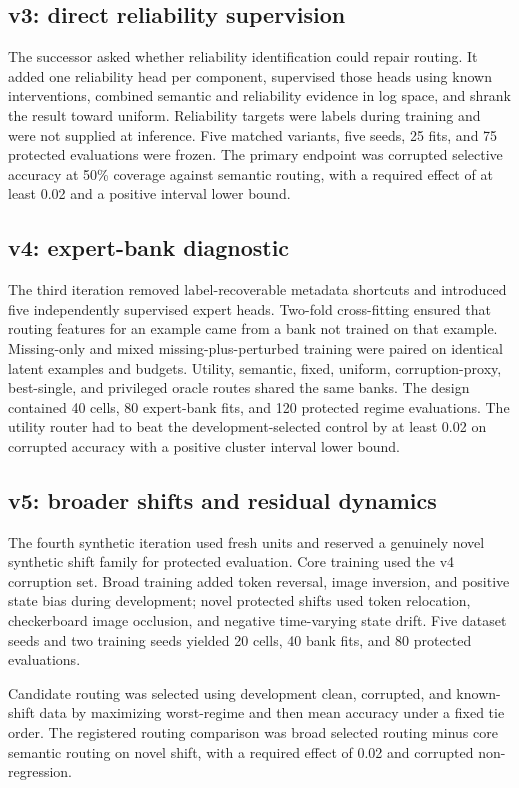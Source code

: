 \documentclass[10pt]{article}
\begin{document}
\subsection{v3: direct reliability supervision}
The successor asked whether reliability identification could repair routing. It added one
reliability head per component, supervised those heads using known interventions, combined
semantic and reliability evidence in log space, and shrank the result toward uniform.
Reliability targets were labels during training and were not supplied at inference. Five
matched variants, five seeds, 25 fits, and 75 protected evaluations were frozen. The
primary endpoint was corrupted selective accuracy at 50\% coverage against semantic
routing, with a required effect of at least 0.02 and a positive interval lower bound.

\subsection{v4: expert-bank diagnostic}
The third iteration removed label-recoverable metadata shortcuts and introduced five
independently supervised expert heads. Two-fold cross-fitting ensured that routing features
for an example came from a bank not trained on that example. Missing-only and mixed
missing-plus-perturbed training were paired on identical latent examples and budgets.
Utility, semantic, fixed, uniform, corruption-proxy, best-single, and privileged oracle
routes shared the same banks. The design contained 40 cells, 80 expert-bank fits, and 120
protected regime evaluations. The utility router had to beat the development-selected
control by at least 0.02 on corrupted accuracy with a positive cluster interval lower
bound.

\subsection{v5: broader shifts and residual dynamics}
The fourth synthetic iteration used fresh units and reserved a genuinely novel synthetic
shift family for protected evaluation. Core training used the v4 corruption set. Broad
training added token reversal, image inversion, and positive state bias during development;
novel protected shifts used token relocation, checkerboard image occlusion, and negative
time-varying state drift. Five dataset seeds and two training seeds yielded 20 cells, 40
bank fits, and 80 protected evaluations.

Candidate routing was selected using development clean, corrupted, and known-shift data by
maximizing worst-regime and then mean accuracy under a fixed tie order. The registered
routing comparison was broad selected routing minus core semantic routing on novel shift,
with a required effect of 0.02 and corrupted non-regression.
\end{document}
